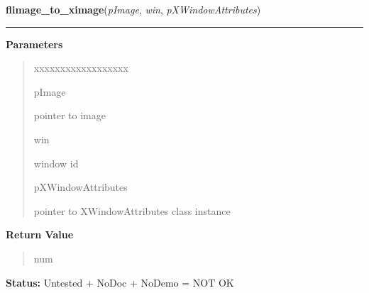 \hspace{.8\funcindent}\begin{boxedminipage}{\funcwidth}

    \raggedright \textbf{flimage\_to\_ximage}(\textit{pImage}, \textit{win}, \textit{pXWindowAttributes})

    \vspace{-1.5ex}

    \rule{\textwidth}{0.5\fboxrule}
\setlength{\parskip}{2ex}
\setlength{\parskip}{1ex}
      \textbf{Parameters}
      \vspace{-1ex}

      \begin{quote}
        \begin{Ventry}{xxxxxxxxxxxxxxxxxx}

          \item[pImage]

          pointer to image

          \item[win]

          window id

          \item[pXWindowAttributes]

          pointer to XWindowAttributes class instance

        \end{Ventry}

      \end{quote}

      \textbf{Return Value}
    \vspace{-1ex}

      \begin{quote}
      num

      \end{quote}

\textbf{Status:} Untested + NoDoc + NoDemo = NOT OK



    \end{boxedminipage}

    \label{xformslib:flflimage:flimage_write_annotation}

    \vspace{0.5ex}

